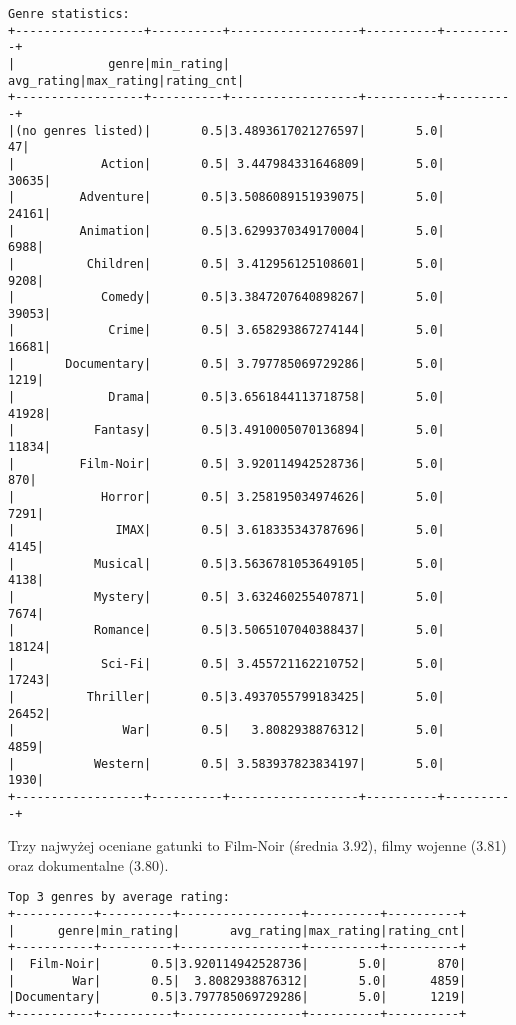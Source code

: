 \documentclass{article}
\begin{document}
\begin{verbatim} 
Genre statistics:
+------------------+----------+------------------+----------+----------+
|             genre|min_rating|        avg_rating|max_rating|rating_cnt|
+------------------+----------+------------------+----------+----------+
|(no genres listed)|       0.5|3.4893617021276597|       5.0|        47|
|            Action|       0.5| 3.447984331646809|       5.0|     30635|
|         Adventure|       0.5|3.5086089151939075|       5.0|     24161|
|         Animation|       0.5|3.6299370349170004|       5.0|      6988|
|          Children|       0.5| 3.412956125108601|       5.0|      9208|
|            Comedy|       0.5|3.3847207640898267|       5.0|     39053|
|             Crime|       0.5| 3.658293867274144|       5.0|     16681|
|       Documentary|       0.5| 3.797785069729286|       5.0|      1219|
|             Drama|       0.5|3.6561844113718758|       5.0|     41928|
|           Fantasy|       0.5|3.4910005070136894|       5.0|     11834|
|         Film-Noir|       0.5| 3.920114942528736|       5.0|       870|
|            Horror|       0.5| 3.258195034974626|       5.0|      7291|
|              IMAX|       0.5| 3.618335343787696|       5.0|      4145|
|           Musical|       0.5|3.5636781053649105|       5.0|      4138|
|           Mystery|       0.5| 3.632460255407871|       5.0|      7674|
|           Romance|       0.5|3.5065107040388437|       5.0|     18124|
|            Sci-Fi|       0.5| 3.455721162210752|       5.0|     17243|
|          Thriller|       0.5|3.4937055799183425|       5.0|     26452|
|               War|       0.5|   3.8082938876312|       5.0|      4859|
|           Western|       0.5| 3.583937823834197|       5.0|      1930|
+------------------+----------+------------------+----------+----------+
\end{verbatim}

Trzy najwyżej oceniane gatunki to Film-Noir (średnia 3.92), filmy wojenne (3.81) oraz dokumentalne (3.80).

\begin{verbatim}
Top 3 genres by average rating:
+-----------+----------+-----------------+----------+----------+
|      genre|min_rating|       avg_rating|max_rating|rating_cnt|
+-----------+----------+-----------------+----------+----------+
|  Film-Noir|       0.5|3.920114942528736|       5.0|       870|
|        War|       0.5|  3.8082938876312|       5.0|      4859|
|Documentary|       0.5|3.797785069729286|       5.0|      1219|
+-----------+----------+-----------------+----------+----------+
\end{verbatim}
\end{document}
